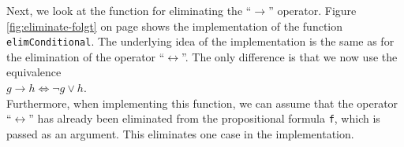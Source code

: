 Next, we look at the function for eliminating the ``$\rightarrow$'' operator. 
Figure
\ref{fig:eliminate-folgt} on page \pageref{fig:eliminate-folgt} shows the
implementation of the function
\texttt{elimConditional}.
The underlying idea of the implementation is the same as for the elimination of the
operator ``$\leftrightarrow$''.  The only difference is that we now use the
equivalence \\[0.2cm]
\hspace*{1.3cm}
$g \rightarrow h \Leftrightarrow \neg g \vee h$. \\[0.2cm]
Furthermore, when implementing this function, we can assume that the operator ``$\leftrightarrow$''
has already been eliminated from the propositional formula \texttt{f}, which is passed as an argument.
This eliminates one case in the implementation. 



